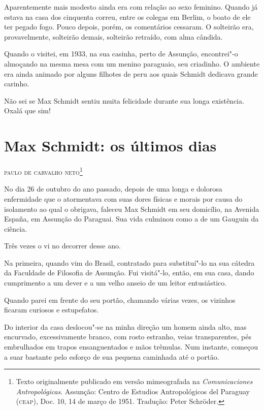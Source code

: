 {Aparentemente mais modesto ainda era com relação ao sexo feminino.
Quando já estava na casa dos cinquenta correu, entre os colegas em
Berlim, o boato de ele ter pegado fogo. Pouco depois, porém, os
comentários cessaram. O solteirão era, provavelmente, solteirão demais,
solteirão retraído, com alma cândida.

Quando o visitei, em 1933, na sua casinha, perto de Assunção,
encontrei"-o almoçando na mesma mesa com um menino paraguaio, seu
criadinho. O ambiente era ainda animado por alguns filhotes de peru aos
quais Schmidt dedicava grande carinho.

Não sei se Max Schmidt sentiu muita felicidade durante sua longa
existência. Oxalá que sim!

\chapter*{Max Schmidt: os últimos dias}

\begin{flushright}
\textsc{paulo de carvalho neto}\footnote{Texto originalmente
  publicado em versão mimeografada na \textit{Comunicaciones
  Antropológicas}. Assunção: Centro de Estudios Antropológicos del
  Paraguay (\textsc{ceap}), Doc. 10, 14 de março de 1951. Tradução: Peter Schröder.}
\end{flushright}

No dia 26 de outubro do ano passado, depois de uma longa e dolorosa
enfermidade que o atormentava com suas dores físicas e morais por causa
do isolamento ao qual o obrigava, faleceu Max Schmidt em seu domicílio,
na Avenida España, em Assunção do Paraguai. Sua vida culminou como a de
um Gauguin da ciência.

Três vezes o vi no decorrer desse ano.

Na primeira, quando vim do Brasil, contratado para substituí"-lo na sua
cátedra da Faculdade de Filosofia de Assunção. Fui visitá"-lo, então, em
sua casa, dando cumprimento a um dever e a um velho anseio de um leitor
entusiástico.

Quando parei em frente do seu portão, chamando várias vezes, os vizinhos
ficaram curiosos e estupefatos.

Do interior da casa deslocou"-se na minha direção um homem ainda alto,
mas encurvado, excessivamente branco, com rosto estranho, veias
transparentes, pés embrulhados em trapos ensanguentados e mãos trêmulas.
Num instante, começou a suar bastante pelo esforço de sua pequena
caminhada até o portão.

}
